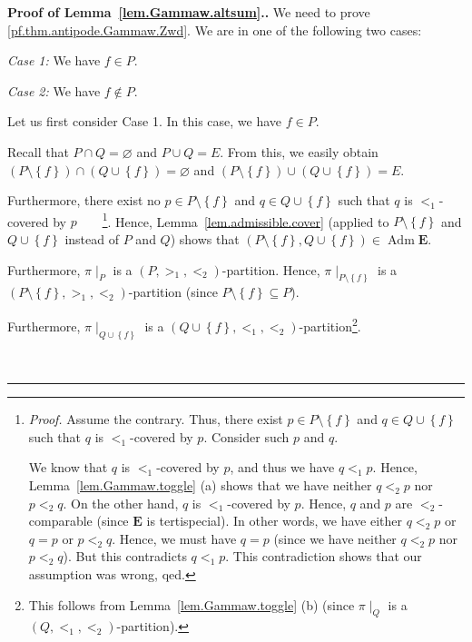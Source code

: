 \documentclass[numbers=enddot,12pt,final,onecolumn,notitlepage,abstracton]{scrartcl}%
\theoremstyle{definition}
\newenvironment{proof}[1][Proof]{\noindent\textbf{#1.} }{\ \rule{0.5em}{0.5em}}
\newcommand{\Adm}{\operatorname{Adm}}
\newcommand{\EE}{{\mathbf{E}}}
\begin{document}
\begin{proof}[Proof of Lemma~\ref{lem.Gammaw.altsum}.]
We need to prove \eqref{pf.thm.antipode.Gammaw.Zwd}. We are in one of the
following two cases:

\textit{Case 1:} We have $f\in P$.

\textit{Case 2:} We have $f\notin P$.

Let us first consider Case 1. In this case, we have $f\in P$.

Recall that $P\cap Q=\varnothing$ and $P\cup Q=E$. From this, we easily obtain
$\left(  P\setminus\left\{  f\right\}  \right)  \cap\left(  Q\cup\left\{
f\right\}  \right)  =\varnothing$ and $\left(  P\setminus\left\{  f\right\}
\right)  \cup\left(  Q\cup\left\{  f\right\}  \right)  =E$.

Furthermore, there exist no $p\in P\setminus\left\{  f\right\}  $ and $q\in
Q\cup\left\{  f\right\}  $ such that $q$ is $<_{1}$-covered by
$p$\ \ \ \ \footnote{\textit{Proof.}
Assume the contrary. Thus, there exist $p\in
P\setminus\left\{  f\right\}  $ and $q\in Q\cup\left\{  f\right\}  $ such that
$q$ is $<_{1}$-covered by $p$. Consider such $p$ and $q$.
\par
We know that $q$ is $<_{1}$-covered by $p$, and thus we have $q<_{1}p$.
Hence, Lemma~\ref{lem.Gammaw.toggle} (a) shows that
we have neither $q <_2 p$ nor $p <_2 q$.
On the other hand,
$q$ is $<_{1}$-covered by $p$. Hence, $q$ and $p$ are
$<_{2}$-comparable (since $\EE$ is tertispecial).
In other words, we have either $q <_2 p$ or $q = p$ or $p <_2 q$.
Hence, we must have $q = p$ (since we have neither $q <_2 p$
nor $p <_2 q$). But this contradicts $q <_1 p$.
This contradiction shows that our
assumption was wrong, qed.}. Hence, Lemma~\ref{lem.admissible.cover} (applied
to $P\setminus\left\{  f\right\}  $ and $Q\cup\left\{  f\right\}  $ instead of
$P$ and $Q$) shows that $\left(  P\setminus\left\{  f\right\}  ,Q\cup\left\{
f\right\}  \right)  \in \Adm \EE$.

Furthermore, $\pi\mid_{P}$ is a $\left(  P,>_{1},<_{2}\right)  $-partition.
Hence, $\pi\mid_{P\setminus\left\{  f\right\}  }$ is a $\left(
P\setminus\left\{  f\right\}  ,>_{1},<_{2}\right)  $-partition (since
$P\setminus\left\{  f\right\}  \subseteq P$).

Furthermore, $\pi\mid_{Q\cup\left\{  f\right\}  }$ is a $\left(  Q\cup\left\{
f\right\}  ,<_{1},<_{2}\right)  $-partition\footnote{This follows from
Lemma~\ref{lem.Gammaw.toggle} (b) (since $\pi\mid_Q$ is a
$\left(Q, <_1, <_2\right)$-partition).}.


\end{proof}
\end{document}
